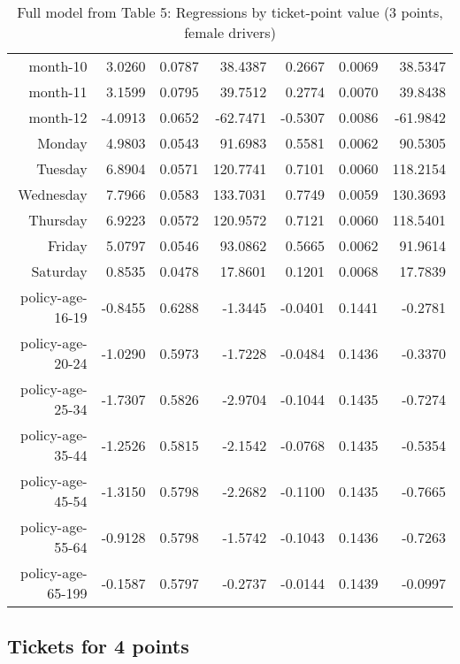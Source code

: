 \documentclass[10pt]{article}
\begin{document}
\begin{table}[ht]
\begin{tabular}{rrrrrrr}
  month-10 & 3.0260 & 0.0787 & 38.4387 & 0.2667 & 0.0069 & 38.5347 \\ 
  month-11 & 3.1599 & 0.0795 & 39.7512 & 0.2774 & 0.0070 & 39.8438 \\ 
  month-12 & -4.0913 & 0.0652 & -62.7471 & -0.5307 & 0.0086 & -61.9842 \\ 
  Monday & 4.9803 & 0.0543 & 91.6983 & 0.5581 & 0.0062 & 90.5305 \\ 
  Tuesday & 6.8904 & 0.0571 & 120.7741 & 0.7101 & 0.0060 & 118.2154 \\ 
  Wednesday & 7.7966 & 0.0583 & 133.7031 & 0.7749 & 0.0059 & 130.3693 \\ 
  Thursday & 6.9223 & 0.0572 & 120.9572 & 0.7121 & 0.0060 & 118.5401 \\ 
  Friday & 5.0797 & 0.0546 & 93.0862 & 0.5665 & 0.0062 & 91.9614 \\ 
  Saturday & 0.8535 & 0.0478 & 17.8601 & 0.1201 & 0.0068 & 17.7839 \\ 
  policy-age-16-19 & -0.8455 & 0.6288 & -1.3445 & -0.0401 & 0.1441 & -0.2781 \\ 
  policy-age-20-24 & -1.0290 & 0.5973 & -1.7228 & -0.0484 & 0.1436 & -0.3370 \\ 
  policy-age-25-34 & -1.7307 & 0.5826 & -2.9704 & -0.1044 & 0.1435 & -0.7274 \\ 
  policy-age-35-44 & -1.2526 & 0.5815 & -2.1542 & -0.0768 & 0.1435 & -0.5354 \\ 
  policy-age-45-54 & -1.3150 & 0.5798 & -2.2682 & -0.1100 & 0.1435 & -0.7665 \\ 
  policy-age-55-64 & -0.9128 & 0.5798 & -1.5742 & -0.1043 & 0.1436 & -0.7263 \\ 
  policy-age-65-199 & -0.1587 & 0.5797 & -0.2737 & -0.0144 & 0.1439 & -0.0997 \\ 
   \hline
\end{tabular}
\caption{Full model from Table 5: Regressions by ticket-point value (3 points, female drivers)} 
\label{tab_5_3_pts_F}
\end{table}


\clearpage
\pagebreak




\subsection*{Tickets for 4 points}
\end{document}
